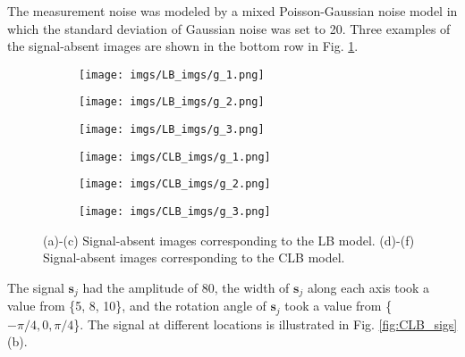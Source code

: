 \documentclass[journal]{IEEEtran}
\renewcommand{\vec}[1]{\mathbf{#1}}
\begin{document}
The measurement noise was modeled by a mixed Poisson-Gaussian noise model\cite{barrett2013foundations} in which the standard deviation of Gaussian noise was set to 20. Three examples of the signal-absent images are shown in the bottom row in Fig. \ref{fig:imgs}.
\begin{figure}[H]
\centering
\begin{subfigure}[b]{0.15\textwidth}
   \centering
 \texttt{[image: imgs/LB\_imgs/g\_1.png]}
  \vspace{-0.5cm}
 \caption{}
 \end{subfigure}
 \begin{subfigure}[b]{0.15\textwidth}
  \centering
 \texttt{[image: imgs/LB\_imgs/g\_2.png]}
  \vspace{-0.5cm}
 \caption{}
 \end{subfigure}
  \begin{subfigure}[b]{0.15\textwidth}
  \centering
 \texttt{[image: imgs/LB\_imgs/g\_3.png]}
  \vspace{-0.5cm}
 \caption{}
 \end{subfigure}

\vspace{0.2cm}
  \begin{subfigure}[b]{0.15\textwidth}
   \centering
 \texttt{[image: imgs/CLB\_imgs/g\_1.png]}
  \vspace{-0.5cm}
 \caption{}
 \end{subfigure}
 \begin{subfigure}[b]{0.15\textwidth}
  \centering
 \texttt{[image: imgs/CLB\_imgs/g\_2.png]}
  \vspace{-0.5cm}
 \caption{}
 \end{subfigure}
  \begin{subfigure}[b]{0.15\textwidth}
  \centering
 \texttt{[image: imgs/CLB\_imgs/g\_3.png]}
  \vspace{-0.5cm}
 \caption{}
 \end{subfigure}
 \caption{ (a)-(c) Signal-absent images corresponding to the LB model. (d)-(f) Signal-absent images corresponding to the CLB model.}
 \label{fig:imgs}
 \end{figure}
 The signal $\vec{s}_j$ had the amplitude of 80,
 the width of $\vec{s}_j$ along each axis took a value from \{5, 8, 10\}, and 
the rotation angle of $\vec{s}_j$ took a value from \{$-\pi/4, 0, \pi/4$\}. 
 The signal at different locations is illustrated in Fig. \ref{fig:CLB_sigs} (b).
\end{document}
